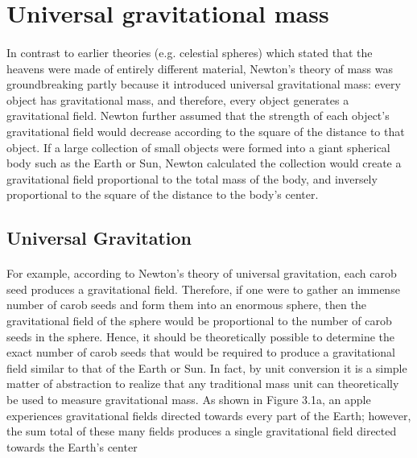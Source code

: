 \documentclass{book}
\begin{document}
	\section{Universal gravitational mass}
	\begin{multicols}{2}
		\paragraph{}
		In contrast to earlier theories (e.g. celestial spheres) which stated that the heavens were made of entirely different material, Newton's theory of mass was groundbreaking partly because it introduced universal gravitational mass: every object has gravitational mass, and therefore, every object generates a gravitational field. Newton further assumed that the strength of each object's gravitational field would decrease according to the square of the distance to that object. If a large collection of small objects were formed into a giant spherical body such as the Earth or Sun, Newton calculated the collection would create a gravitational field proportional to the total mass of the body, and inversely proportional to the square of the distance to the body's center.
	\end{multicols}
	
	\subsection{Universal Gravitation}
	\paragraph{}
	For example, according to Newton's theory of universal gravitation, each carob seed produces a gravitational field. Therefore, if one were to gather an immense number of carob seeds and form them into an enormous sphere, then the gravitational field of the sphere would be proportional to the number of carob seeds in the sphere. Hence, it should be theoretically possible to determine the exact number of carob seeds that would be required to produce a gravitational field similar to that of the Earth or Sun. In fact, by unit conversion it is a simple matter of abstraction to realize that any traditional mass unit can theoretically be used to measure gravitational mass. As shown in Figure 3.1a, an apple experiences gravitational fields directed towards every part of the Earth; however, the sum total of these many fields produces a single gravitational field directed towards the Earth's center
	
\end{document}
